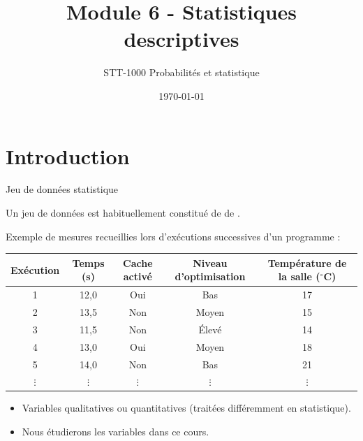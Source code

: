 \documentclass{BeamerTemplate}
\title{Module 6 - Statistiques descriptives}
\subtitle{STT-1000 Probabilités et statistique}
\date{\today}
\begin{document}
\begin{frame}
\titlepage
\end{frame}

\section{Introduction}

\begin{frame}[t]{Jeu de données statistique}

Un jeu de données est habituellement constitué de  de
.

\medskip
{\small
Exemple de mesures recueillies lors d'exécutions successives d'un programme :

{\scriptsize
\begin{center}
\begin{tabular}{ccccc}\hline
Exécution & Temps (s) & Cache activé & Niveau d'optimisation & Température de la salle ($^\circ$C) \\ \hline
1 & 12,0 & Oui & Bas & 17 \\
2 & 13,5 & Non & Moyen & 15 \\
3 & 11,5 & Non & Élevé & 14 \\
4 & 13,0 & Oui & Moyen & 18 \\
5 & 14,0 & Non & Bas & 21 \\
$\vdots$&$\vdots$&$\vdots$&$\vdots$&$\vdots$\\\hline
\end{tabular}
\end{center}
}

\begin{itemize}
\item Variables qualitatives ou quantitatives (traitées différemment en statistique).
\item Nous étudierons les variables  dans ce cours.
\end{itemize}
}
\end{frame}
\end{document}
